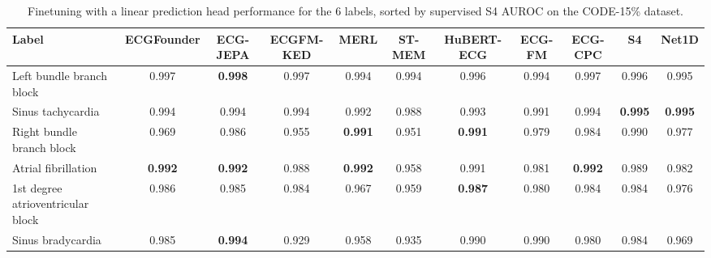 \documentclass{article}
\begin{document}
                \begin{table}[htbp]
                    \centering
                    \tiny
                    \setlength{\tabcolsep}{2pt}
                    \caption{Finetuning with a linear prediction head performance for the 6 labels, sorted by supervised S4 AUROC on the CODE-15\% dataset.}
                    \begin{tabular}{lcccccccccc}
                        \toprule
                        \textbf{Label} & \textbf{ECGFounder} & \textbf{ECG-JEPA} & \textbf{ECGFM-KED} & \textbf{MERL} & \textbf{ST-MEM} & \textbf{HuBERT-ECG} & \textbf{ECG-FM} & \textbf{ECG-CPC} & \textbf{S4} & \textbf{Net1D} \\
                        \midrule
                        Left bundle branch block & 0.997 & \textbf{0.998} & 0.997 & 0.994 & 0.994 & 0.996 & 0.994 & 0.997 & 0.996 & 0.995 \\
                        Sinus tachycardia & 0.994 & 0.994 & 0.994 & 0.992 & 0.988 & 0.993 & 0.991 & 0.994 & \textbf{0.995} & \textbf{0.995} \\
                        Right bundle branch block & 0.969 & 0.986 & 0.955 & \textbf{0.991} & 0.951 & \textbf{0.991} & 0.979 & 0.984 & 0.990 & 0.977 \\
                        Atrial fibrillation & \textbf{0.992} & \textbf{0.992} & 0.988 & \textbf{0.992} & 0.958 & 0.991 & 0.981 & \textbf{0.992} & 0.989 & 0.982 \\
                        1st degree atrioventricular block & 0.986 & 0.985 & 0.984 & 0.967 & 0.959 & \textbf{0.987} & 0.980 & 0.984 & 0.984 & 0.976 \\
                        Sinus bradycardia & 0.985 & \textbf{0.994} & 0.929 & 0.958 & 0.935 & 0.990 & 0.990 & 0.980 & 0.984 & 0.969 \\
                        \bottomrule
                    \end{tabular}
                    \label{tab:results_overview_code}
                \end{table}
                
\end{document}
